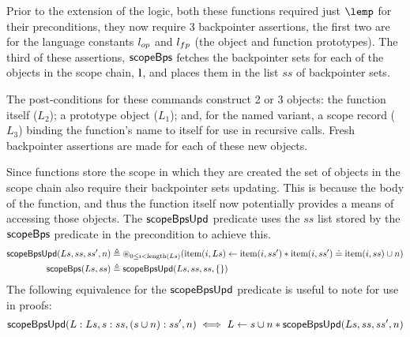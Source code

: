 \documentclass[a4paper,notitlepage]{report}
\begin{document}
    Prior to the extension of the logic, both these functions required just
    $\lemp$ for their preconditions, they now require 3 backpointer assertions,
    the first two are for the language constants $l_{op}$ and $l_{fp}$ (the object
    and function prototypes). The third of these assertions, $\mathsf{scopeBps}$
    fetches the backpointer sets for each of the objects in the scope chain,
    $\textbf{l}$, and places them in the list $ss$ of backpointer sets.

    The post-conditions for these commands construct 2 or 3 objects: the
    function itself ($L_2$); a prototype object ($L_1$); and, for the named
    variant, a scope record ($L_3$) binding the function's name to itself for
    use in recursive calls.
    Fresh backpointer assertions are made for each of these new objects.

    Since functions store the scope in which they are created the set of objects
    in the scope chain also require their
    backpointer sets updating. This is because the body of the function, and
    thus the function itself now potentially provides a means of accessing those
    objects. The $\mathsf{scopeBpsUpd}$ predicate uses the $ss$ list stored by the
    $\mathsf{scopeBps}$ predicate in the precondition to achieve this.
    \begin{align*}
      \mathsf{scopeBpsUpd}(Ls, ss, ss', n) & \triangleq \circledast_{0\leq i<\text{length}(Ls)}(
        \text{item}(i,Ls) \leftarrow \text{item}(i,ss') \mathbin{*} \text{item}(i,ss') \doteq
        \text{item}(i,ss)
        \cup n) \\
      \mathsf{scopeBps}(Ls, ss) & \triangleq \mathsf{scopeBpsUpd}(Ls, ss, ss, \{\})
    \end{align*}
    The following equivalence for the $\mathsf{scopeBpsUpd}$ predicate is useful to note
    for use in proofs:
    \[
      \mathsf{scopeBpsUpd}(L:Ls, s:ss, (s \cup n):ss', n) \iff L \leftarrow s \cup n \mathbin{*}
      \mathsf{scopeBpsUpd}(Ls, ss, ss', n)
    \]
\end{document}
